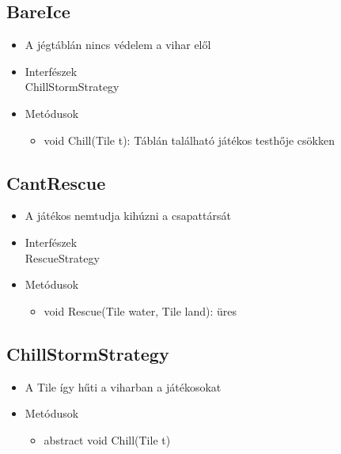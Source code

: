 \subsection{BareIce}
\begin{itemize}
\item A jégtáblán nincs védelem a vihar elől\\

\item Interfészek\\
ChillStormStrategy

\item Metódusok
	\begin{itemize}
		\item void Chill(Tile t): Táblán található játékos testhője csökken
	\end{itemize}
\end{itemize}

\subsection{CantRescue}
\begin{itemize}
	\item A játékos nemtudja kihúzni a csapattársát\\
	
\item Interfészek\\
RescueStrategy

\item Metódusok
\begin{itemize}
	\item void Rescue(Tile water, Tile land): üres
\end{itemize}
\end{itemize}

\subsection{ChillStormStrategy}
\begin{itemize}
	\item A Tile így hűti a viharban a játékosokat\\

	\item Metódusok
	\begin{itemize}
		\item abstract void Chill(Tile t)
	\end{itemize}
\end{itemize}

